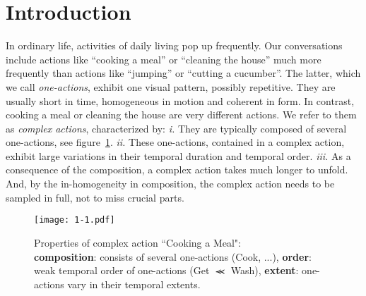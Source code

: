 \documentclass[10pt,twocolumn,letterpaper]{article}
\begin{document}
\section{Introduction}
In ordinary life, activities of daily living pop up frequently.
Our conversations include actions like ``cooking a meal'' or ``cleaning the house'' much more frequently than actions like ``jumping'' or ``cutting a cucumber''.
The latter, which we call \emph{one-actions}, exhibit one visual pattern, possibly repetitive.
They are usually short in time, homogeneous in motion and coherent in form.
In contrast, cooking a meal or cleaning the house are very different actions.
We refer to them as \emph{complex actions}, characterized by:
\emph{i.} They are typically composed of several one-actions, see  figure~\ref{fig:1-1}.
\emph{ii.}
These one-actions, contained in a complex action, exhibit large variations in their temporal duration and temporal order.
\emph{iii.} As a consequence of the composition, a complex action takes much longer to unfold.
And, by the in-homogeneity in composition, the complex action needs to be sampled in full, not to miss crucial parts.
\begin{figure}[!ht]
\begin{center}
\texttt{[image: 1-1.pdf]}
\end{center}
\caption{Properties of complex action ``Cooking a Meal":\\
\textbf{composition}: consists of several one-actions (Cook, ...),
\protect\linebreak
\textbf{order}: weak temporal order of one-actions (Get {\large $\llcurly$} Wash),
\protect\linebreak
\textbf{extent}: one-actions vary in their temporal extents.}
\label{fig:1-1}
\vspace*{-5mm}
\end{figure}
\end{document}
